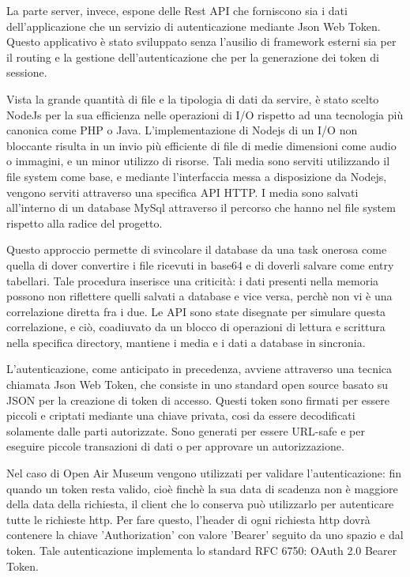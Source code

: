 La parte server, invece, espone delle Rest API che forniscono sia i dati dell'applicazione che un servizio di autenticazione mediante Json Web Token\cite{JWT}. Questo applicativo è stato sviluppato senza l’ausilio di framework esterni sia per il routing e la gestione dell’autenticazione che per la generazione dei token di sessione.\vspace{5mm}

 Vista la grande quantità di file e la tipologia di dati da servire, è stato scelto NodeJs per la sua efficienza nelle operazioni di I/O rispetto ad una tecnologia più canonica come PHP\cite{PHP} o Java\cite{Java}. L'implementazione di Nodejs di un I/O non bloccante\cite{BlockingVsNonBlocking} risulta in un invio più efficiente di file di medie dimensioni come audio o immagini, e un minor utilizzo di risorse. Tali media sono serviti utilizzando il file system come base, e mediante l'interfaccia messa a disposizione da Nodejs, vengono serviti attraverso una specifica API HTTP. I media sono salvati all'interno di un database MySql attraverso il percorso che hanno nel file system rispetto alla radice del progetto.\vspace{5mm}
 
  Questo approccio permette di svincolare il database da una task onerosa come quella di dover convertire i file ricevuti in base64 e di doverli salvare come entry tabellari. Tale procedura inserisce una criticità: i dati presenti nella memoria possono non riflettere quelli salvati a database e vice versa, perchè non vi è una correlazione diretta fra i due. Le API sono state disegnate per simulare questa correlazione, e ciò, coadiuvato da un blocco di operazioni di lettura e scrittura nella specifica directory, mantiene i media e i dati a database in sincronia. \vspace{5mm}

L'autenticazione, come anticipato in precedenza, avviene attraverso una tecnica chiamata Json Web Token\cite{JWT}, che consiste in uno standard open source basato su JSON per la creazione di token di accesso. Questi token sono firmati per essere piccoli e criptati mediante una chiave privata, cosi da essere decodificati solamente dalle parti autorizzate. Sono generati per essere URL-safe e per eseguire piccole transazioni di dati o per approvare un autorizzazione.  \vspace{5mm}

Nel caso di Open Air Museum vengono utilizzati per validare l'autenticazione: fin quando un token resta valido, cioè finchè la sua data di scadenza non è maggiore della data della richiesta, il client che lo conserva può utilizzarlo per autenticare tutte le richieste http. Per fare questo, l'header di ogni richiesta http dovrà contenere la chiave 'Authorization' con valore 'Bearer' seguito da uno spazio e dal token. Tale autenticazione implementa lo standard RFC 6750: OAuth 2.0 Bearer Token\cite{Bearer}.

